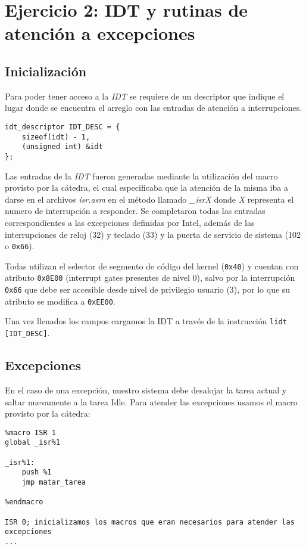 \section{Ejercicio 2: IDT y rutinas de atención a excepciones}

	\subsection{Inicialización}

	Para poder tener acceso a la \textit{IDT} se requiere de un descriptor que indique el lugar donde se encuentra el arreglo con las entradas de atención a interrupciones. 

	\lstset{escapechar=@,style=c}
	\begin{lstlisting}
idt_descriptor IDT_DESC = {
	sizeof(idt) - 1,
	(unsigned int) &idt
};
	\end{lstlisting}

	Las entradas de la \textit{IDT} fueron generadas mediante la utilización del macro provisto por la cátedra, el cual especificaba que la atención de la misma iba a darse en el archivos \textit{isr.asm} en el método llamado \textit{\_isrX} donde \textit{X} representa el numero de interrupción a responder. Se completaron todas las entradas correspondientes a las excepciones definidas por Intel, además de las interrupciones de reloj (32) y teclado (33) y la puerta de servicio de sistema (102 o \texttt{0x66}).

	Todas utilizan el selector de segmento de código del kernel (\texttt{0x40}) y cuentan con atributo \texttt{0x8E00} (interrupt gates presentes de nivel 0), salvo por la interrupción \texttt{0x66} que debe ser accesible desde nivel de privilegio usuario (3), por lo que su atributo se modifica a \texttt{0xEE00}.

	Una vez llenados los campos cargamos la IDT a través de la instrucción \texttt{lidt [IDT\_DESC]}.

	\subsection{Excepciones}

	En el caso de una excepción, nuestro sistema debe desalojar la tarea actual y saltar nuevamente a la tarea Idle. Para atender las excepciones usamos el macro provisto por la cátedra:

	\lstset{escapechar=@,style=asm}
	\begin{lstlisting}
%macro ISR 1
global _isr%1

_isr%1:
    push %1
    jmp matar_tarea

%endmacro

ISR 0; inicializamos los macros que eran necesarios para atender las excepciones
...
	\end{lstlisting}

